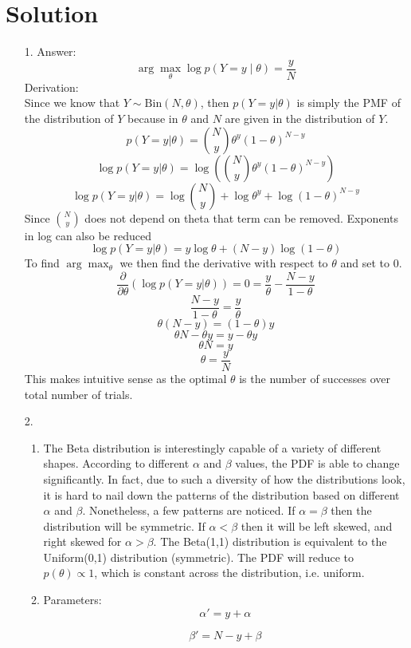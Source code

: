 \documentclass[submit]{harvardml}
\newenvironment{answer}
  {\section*{Solution}}
{}
\begin{document}
\begin{answer}
  \begin{enumerate}
    \item[1.]
      Answer:
      \[
        \arg \max_{\theta} \log p(Y = y \mid \theta) = \frac{y}{N}
      \]
      Derivation:
    \\ Since we know that $Y \sim \mathrm{Bin}(N, \theta)$, then $p(Y=y | \theta)$ is simply the PMF of the distribution of $Y$ because in $\theta$ and $N$ are given in the distribution of $Y$.
    $$p(Y=y|\theta) = {N \choose y}\theta^y(1-\theta)^{N-y}$$
    $$\log p(Y=y|\theta) = \log({N \choose y}\theta^y(1-\theta)^{N-y})$$
    $$\log p(Y=y|\theta) = \log{N \choose y}+\log\theta^y + \log(1-\theta)^{N-y}$$
    Since ${N \choose y}$ does not depend on theta that term can be removed. Exponents in log can also be reduced
    $$\log p(Y=y|\theta) = y\log\theta + (N-y)\log(1-\theta)$$
    To find $\arg \max_{\theta}$ we then find the derivative with respect to $\theta$ and set to 0.
    $$\frac{\partial}{\partial \theta}(\log p(Y=y|\theta)) = 0 = \frac{y}{\theta} - \frac{N-y}{1-\theta}$$
    $$\frac{N-y}{1-\theta} = \frac{y}{\theta}$$
    $$\theta(N-y) = (1-\theta)y$$
    $$\theta N - \theta y = y - \theta y$$
    $$\theta N = y$$
    $$\theta = \frac{y}{N}$$
    This makes intuitive sense as the optimal $\theta$ is the number of successes over total number of trials.
    \item[2.]
      \begin{enumerate}
        \item
            The Beta distribution is interestingly capable of a variety of different shapes. According to different $\alpha$ and $\beta$ values, the PDF is able to change significantly. In fact, due to such a diversity of how the distributions look, it is hard to nail down the patterns of the distribution based on different $\alpha$ and $\beta$. Nonetheless, a few patterns are noticed. If $\alpha = \beta$ then the distribution will be symmetric. If $\alpha < \beta$ then it will be left skewed, and right skewed for $\alpha > \beta$. The Beta(1,1) distribution is equivalent to the Uniform(0,1) distribution (symmetric). The PDF will reduce to $p(\theta) \propto 1$, which is constant across the distribution, i.e. uniform. 
        \item

              Parameters:
              \[
                \alpha' = y + \alpha
              \]

              \[
                \beta' = N - y + \beta
              \]


\end{enumerate}
\end{enumerate}
\end{answer}
\end{document}
